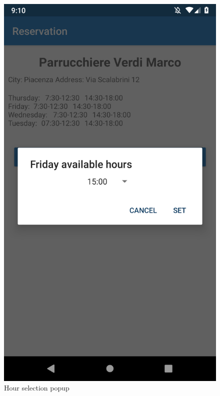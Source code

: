 \begin{figure}[h]
\centering
  \centering
  \includegraphics[height=.4\textheight, keepaspectratio=true]{Img/Screens/Customer_Search_Selected_Hour}
  \caption{Hour selection popup}
\end{figure}


